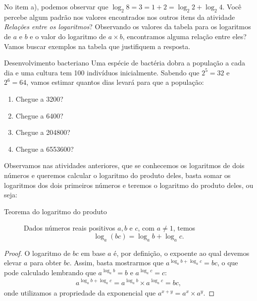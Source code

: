 \begin{reflection}
No item a), podemos observar que $\log_2 8 = 3 = 1 + 2 = \log_2 2 + \log_2 4$. Você percebe algum padrão nos valores encontrados nos outros itens da atividade \textit{Relações entre os logaritmos}? Observando os valores da tabela para os logaritmos de $a$ e $b$ e o valor do logaritmo de $a \times b$, encontramos alguma relação entre eles? Vamos buscar exemplos na tabela que justifiquem a resposta.
\end{reflection}



\begin{task}{Desenvolvimento bacteriano}
Uma espécie de bactéria dobra a população a cada dia e uma cultura tem 100 indivíduos inicialmente. Sabendo que $2^5=32$ e $2^6=64$, vamos estimar quantos dias levará para que a população: 
\begin{enumerate}
\item Chegue a 3200?
\item Chegue a 6400?
\item Chegue a 204800?
\item Chegue a 6553600?
\end{enumerate}
\end{task}

\label{explore_log_prod}


Observamos nas atividades anteriores, que se conhecemos os logaritmos de dois números e queremos calcular o logaritmo do produto deles, basta somar os logaritmos dos dois primeiros números e teremos o logaritmo do produto deles, ou seja:


\begin{description}
\item[Teorema do logaritmo do produto]\label{teo_log_prod}
Dados números reais positivos $a,b$ e $c$, com $a \neq 1$, temos
$$
\log_a(bc) = \log_a b + \log_a c.
$$
\end{description}
\begin{proof}
O logaritmo de $bc$ em base $a$ é, por definição, o expoente ao qual devemos elevar $a$ para obter $bc$. Assim, basta mostrarmos que $a^{\log_a b + \log_a c} =bc$, o que pode calculado lembrando que $a^{\log_a b}=b$ e $a^{\log_a c}=c$:
\begin{align*}
a^{\log_a b + \log_a c} = a^{\log_a b} \times a^{\log_a c} =bc,
\end{align*}
onde utilizamos a propriedade da exponencial que $a^{x+y} = a^{x} \times a^{y}$.
\end{proof}

